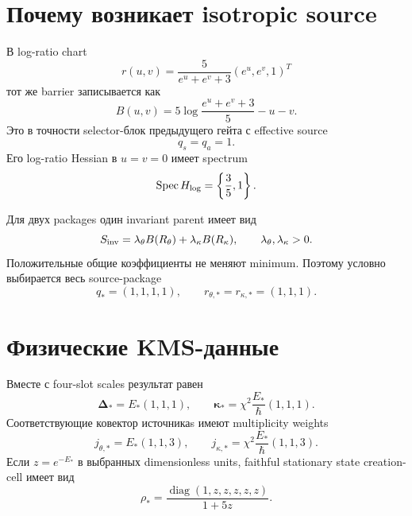 \section{Почему возникает isotropic source}

В log-ratio chart
\begin{equation}
 r(u,v)=\frac5{e^u+e^v+3}(e^u,e^v,1)^T
 \label{eq:v9-kms-shape-invariant-parent-chart}
\end{equation}
тот же barrier записывается как
\begin{equation}
 B(u,v)=5\log\frac{e^u+e^v+3}{5}-u-v.
 \label{eq:v9-kms-shape-invariant-parent-log-form}
\end{equation}
Это в точности selector-блок предыдущего гейта с effective source
\begin{equation}
 q_s=q_a=1.
 \label{eq:v9-kms-shape-invariant-parent-effective-source}
\end{equation}
Его log-ratio Hessian в $u=v=0$ имеет spectrum
\begin{equation}
 \operatorname{Spec} H_{\log}=\left\{\frac35,1\right\}.
 \label{eq:v9-kms-shape-invariant-parent-log-spectrum}
\end{equation}

Для двух packages один invariant parent имеет вид
\begin{equation}
 S_{\rm inv}=\lambda_\theta B(R_\theta)
 +\lambda_\kappa B(R_\kappa),
 \qquad \lambda_\theta,\lambda_\kappa>0.
 \label{eq:v9-kms-shape-invariant-parent-two-copy}
\end{equation}
Положительные общие коэффициенты не меняют minimum. Поэтому условно
выбирается весь source-package
\begin{equation}
 q_*=(1,1,1,1),
 \qquad r_{\theta,*}=r_{\kappa,*}=(1,1,1).
 \label{eq:v9-kms-shape-invariant-parent-selected-package}
\end{equation}

\section{Физические KMS-данные}

Вместе с four-slot scales результат равен
\begin{equation}
 \boldsymbol\Delta_*=E_*(1,1,1),
 \qquad
 \boldsymbol\kappa_*=\chi^2\frac{E_*}{\hbar}(1,1,1).
 \label{eq:v9-kms-shape-invariant-parent-physical-data}
\end{equation}
Соответствующие ковектор источникаs имеют multiplicity weights
\begin{equation}
 j_{\theta,*}=E_*(1,1,3),
 \qquad
 j_{\kappa,*}=\chi^2\frac{E_*}{\hbar}(1,1,3).
 \label{eq:v9-kms-shape-invariant-parent-covectors}
\end{equation}
Если $z=e^{-E_*}$ в выбранных dimensionless units, faithful stationary
state creation-cell имеет вид
\begin{equation}
 \rho_*=\frac{\operatorname{diag}(1,z,z,z,z,z)}{1+5z}.
 \label{eq:v9-kms-shape-invariant-parent-stationary-state}
\end{equation}

